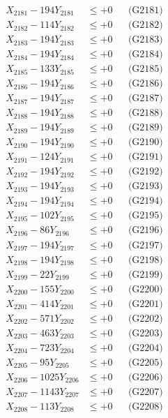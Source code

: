 \documentclass[a4paper,10pt]{article}
\begin{document}
{\begin{align}
\allowbreak
X_{2181} - 194Y_{2181} &\leq +0 && \text{(G2181)} \\
X_{2182} - 114Y_{2182} &\leq +0 && \text{(G2182)} \\
X_{2183} - 194Y_{2183} &\leq +0 && \text{(G2183)} \\
X_{2184} - 194Y_{2184} &\leq +0 && \text{(G2184)} \\
X_{2185} - 133Y_{2185} &\leq +0 && \text{(G2185)} \\
X_{2186} - 194Y_{2186} &\leq +0 && \text{(G2186)} \\
X_{2187} - 194Y_{2187} &\leq +0 && \text{(G2187)} \\
X_{2188} - 194Y_{2188} &\leq +0 && \text{(G2188)} \\
X_{2189} - 194Y_{2189} &\leq +0 && \text{(G2189)} \\
X_{2190} - 194Y_{2190} &\leq +0 && \text{(G2190)} \\
\allowbreak
X_{2191} - 124Y_{2191} &\leq +0 && \text{(G2191)} \\
X_{2192} - 194Y_{2192} &\leq +0 && \text{(G2192)} \\
X_{2193} - 194Y_{2193} &\leq +0 && \text{(G2193)} \\
X_{2194} - 194Y_{2194} &\leq +0 && \text{(G2194)} \\
X_{2195} - 102Y_{2195} &\leq +0 && \text{(G2195)} \\
X_{2196} - 86Y_{2196} &\leq +0 && \text{(G2196)} \\
X_{2197} - 194Y_{2197} &\leq +0 && \text{(G2197)} \\
X_{2198} - 194Y_{2198} &\leq +0 && \text{(G2198)} \\
X_{2199} - 22Y_{2199} &\leq +0 && \text{(G2199)} \\
X_{2200} - 155Y_{2200} &\leq +0 && \text{(G2200)} \\
\allowbreak
X_{2201} - 414Y_{2201} &\leq +0 && \text{(G2201)} \\
X_{2202} - 571Y_{2202} &\leq +0 && \text{(G2202)} \\
X_{2203} - 463Y_{2203} &\leq +0 && \text{(G2203)} \\
X_{2204} - 723Y_{2204} &\leq +0 && \text{(G2204)} \\
X_{2205} - 95Y_{2205} &\leq +0 && \text{(G2205)} \\
X_{2206} - 1025Y_{2206} &\leq +0 && \text{(G2206)} \\
X_{2207} - 1143Y_{2207} &\leq +0 && \text{(G2207)} \\
X_{2208} - 113Y_{2208} &\leq +0 && \text{(G2208)} \\

\end{align}}
\end{document}
